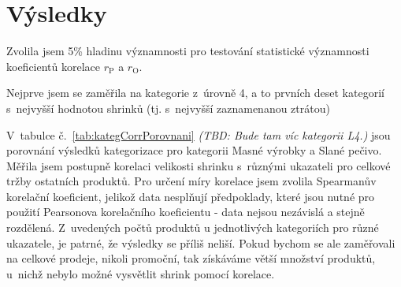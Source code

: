 \section{Výsledky}
Zvolila jsem 5\% hladinu významnosti pro testování statistické významnosti koeficientů korelace $r_\mathrm{P}$ a $r_\mathrm{O}$.

Nejprve jsem se zaměřila na kategorie z~úrovně 4, a to prvních deset kategorií s~nejvyšší hodnotou shrinků (tj. s~nejvyšší zaznamenanou ztrátou) 

V~tabulce č.~\ref*{tab:kategCorrPorovnani} \emph{(TBD: Bude tam víc kategorii L4.)} jsou porovnání výsledků kategorizace pro kategorii Masné výrobky a Slané pečivo. Měřila jsem postupně korelaci velikosti shrinku s~různými ukazateli pro celkové tržby ostatních produktů. Pro určení míry korelace jsem zvolila Spearmanův korelační koeficient, jelikož data nesplňují předpoklady, které jsou nutné pro použití Pearsonova korelačního koeficientu - data nejsou nezávislá a stejně rozdělená. 
Z~uvedených počtů produktů u jednotlivých kategoriích pro různé ukazatele, je patrné, že výsledky se příliš neliší. Pokud bychom se ale zaměřovali na celkové prodeje, nikoli promoční, tak získáváme větší množství produktů, u~nichž nebylo možné vysvětlit shrink pomocí korelace. 


